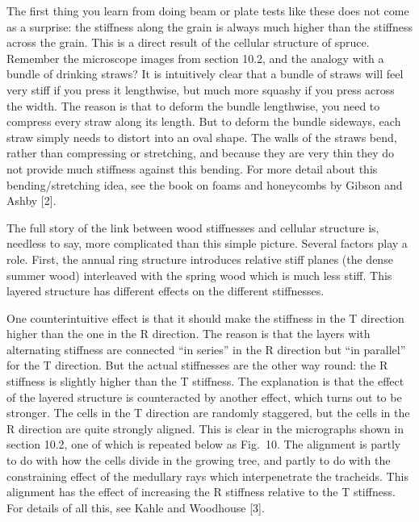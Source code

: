   The first thing you learn from doing beam or plate tests like these does not 
  come as a surprise: the stiffness along the grain is always much higher than 
  the stiffness across the grain. This is a direct result of the cellular 
  structure of spruce. Remember the microscope images from section 10.2, and 
  the analogy with a bundle of drinking straws? It is intuitively clear that a 
  bundle of straws will feel very stiff if you press it lengthwise, but much 
  more squashy if you press across the width. The reason is that to deform the 
  bundle lengthwise, you need to compress every straw along its length. But to 
  deform the bundle sideways, each straw simply needs to distort into an oval 
  shape. The walls of the straws bend, rather than compressing or stretching, 
  and because they are very thin they do not provide much stiffness against 
  this bending. For more detail about this bending/stretching idea, see the 
  book on foams and honeycombs by Gibson and Ashby [2]. 

  The full story of the link between wood stiffnesses and cellular structure 
  is, needless to say, more complicated than this simple picture. Several 
  factors play a role. First, the annual ring structure introduces relative 
  stiff planes (the dense summer wood) interleaved with the spring wood which 
  is much less stiff. This layered structure has different effects on the 
  different stiffnesses. 

  One counterintuitive effect is that it should make the stiffness in the T 
  direction higher than the one in the R direction. The reason is that the 
  layers with alternating stiffness are connected ``in series'' in the R 
  direction but ``in parallel'' for the T direction. But the actual stiffnesses 
  are the other way round: the R stiffness is slightly higher than the T 
  stiffness. The explanation is that the effect of the layered structure is 
  counteracted by another effect, which turns out to be stronger. The cells in 
  the T direction are randomly staggered, but the cells in the R direction are 
  quite strongly aligned. This is clear in the micrographs shown in section 
  10.2, one of which is repeated below as Fig.\ 10. The alignment is partly to 
  do with how the cells divide in the growing tree, and partly to do with the 
  constraining effect of the medullary rays which interpenetrate the tracheids. 
  This alignment has the effect of increasing the R stiffness relative to the T 
  stiffness. For details of all this, see Kahle and Woodhouse [3]. 

